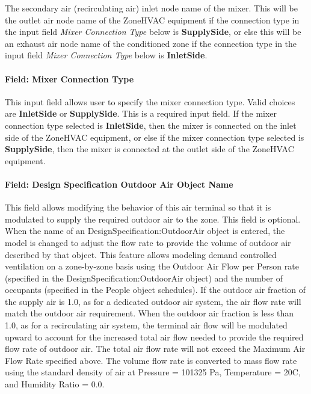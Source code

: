 The secondary air (recirculating air) inlet node name of the mixer. This will be the outlet air node name of the ZoneHVAC equipment if the connection type in the input field \textit{Mixer Connection Type} below is \textbf{SupplySide}, or else this will be an exhaust air node name of the conditioned zone if the connection type in the input field \textit{Mixer Connection Type} below is \textbf{InletSide}.

\paragraph{Field: Mixer Connection Type}\label{field-mixer-connection-type}

This input field allows user to specify the mixer connection type. Valid choices are \textbf{InletSide} or \textbf{SupplySide}. This is a required input field. If the mixer connection type selected is \textbf{InletSide}, then the mixer is connected on the inlet side of the ZoneHVAC equipment, or else if the mixer connection type selected is \textbf{SupplySide}, then the mixer is connected at the outlet side of the ZoneHVAC equipment.\\ 

\paragraph{Field: Design Specification Outdoor Air Object Name}\label{field-DSOA-object-name}

This field allows modifying the behavior of this air terminal so that it is modulated to supply the required outdoor air to the zone.  This field is optional. When the name of an DesignSpecification:OutdoorAir object is entered, the model is changed to adjust the flow rate to provide the volume of outdoor air described by that object.  This feature allows modeling demand controlled ventilation on a zone-by-zone basis using the Outdoor Air Flow per Person rate (specified in the DesignSpecification:OutdoorAir object) and the number of occupants (specified in the People object schedules).  If the outdoor air fraction of the supply air is 1.0, as for a dedicated outdoor air system, the air flow rate will match the outdoor air requirement.  When the outdoor air fraction is less than 1.0, as for a recirculating air system, the terminal air flow will be modulated upward to account for the increased total air flow needed to provide the required flow rate of outdoor air.   The total air flow rate will not exceed the Maximum Air Flow Rate specified above. The volume flow rate is converted to mass flow rate using the standard density of air at Pressure = 101325 Pa, Temperature = 20C, and Humidity Ratio = 0.0.


